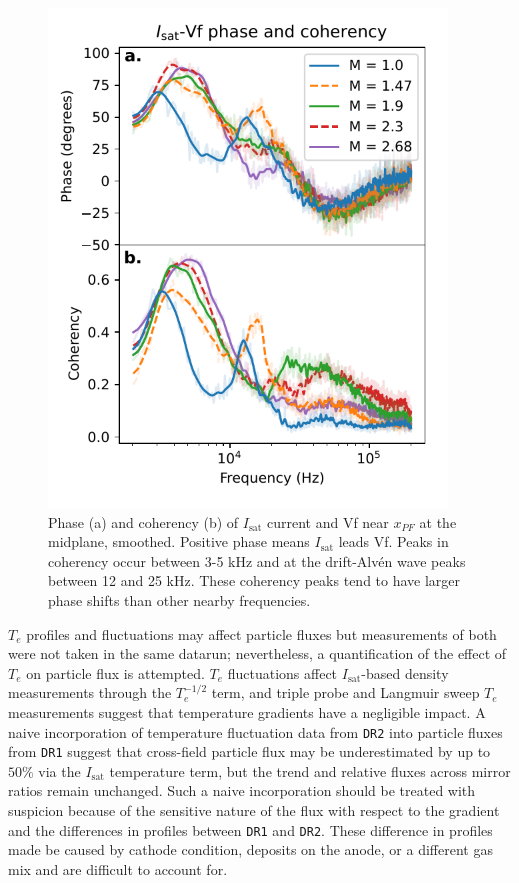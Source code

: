 \begin{figure}
    \centering
    \includegraphics[width=300pt]{figures/fig9.pdf}
    \caption[Phase and coherency of $I_\text{sat}$ current and Vf near $x_{PF}$]{Phase (a) and coherency (b) of $I_\text{sat}$ current and Vf near $x_{PF}$ at the midplane, smoothed. Positive phase means $I_\text{sat}$ leads Vf. Peaks in coherency occur between 3-5 kHz and at the drift-Alv\'en wave peaks between 12 and 25 kHz. These coherency peaks tend to have larger phase shifts than other nearby frequencies. }
    \label{fig:isat-Vf_phase}
\end{figure}

$T_e$ profiles and fluctuations may affect particle fluxes but measurements of both were not taken in the same datarun; nevertheless, a quantification of the effect of $T_e$ on particle flux is attempted.
$T_e$ fluctuations affect $I_\text{sat}$-based density measurements through the $T_e^{-1/2}$ term, and triple probe and Langmuir sweep $T_e$ measurements suggest that temperature gradients have a negligible impact. A naive incorporation of temperature fluctuation data from \texttt{DR2} into particle fluxes from \texttt{DR1} suggest that cross-field particle flux may be underestimated by up to $50\%$ via the $I_\text{sat}$ temperature term, but the trend and relative fluxes across mirror ratios remain unchanged. Such a naive incorporation should be treated with suspicion because of the sensitive nature of the flux with respect to the gradient and the differences in profiles between \texttt{DR1} and \texttt{DR2}. These difference in profiles made be caused by cathode condition, deposits on the anode, or a different gas mix and are difficult to account for.

